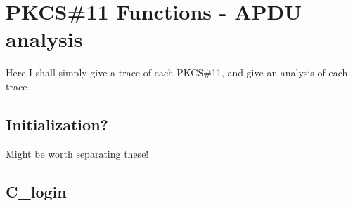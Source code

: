 \documentclass[bsc,frontabs,twoside,singlespacing,parskip,deptreport]{infthesis}     %
\begin{document}

\chapter{PKCS\#11 Functions - APDU analysis}

Here I shall simply give a trace of each PKCS\#11, and give an analysis of each trace

\section{Initialization?}
Might be worth separating these!
\section{C\_login}
\end{document}

